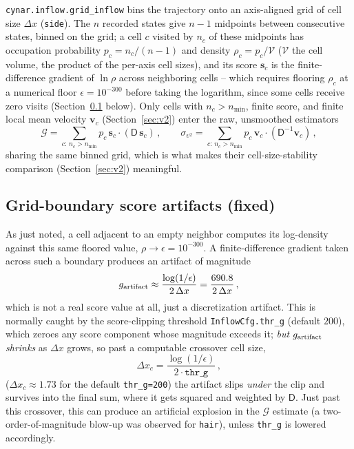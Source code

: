\documentclass[11pt]{article}
\newcommand{\inflow}{\mathcal{G}}
\newcommand{\MD}{{\mathsf{D}}}
\newcommand{\score}{{\bm{s}}}
\newcommand{\velo}{{\bm{v}}}
\begin{document}
\texttt{cynar.inflow.grid\_inflow} bins the trajectory onto an axis-aligned grid of cell size $\Delta x$ (\texttt{side}). The $n$ recorded states give $n-1$ midpoints between consecutive states, binned on the grid; a cell $c$ visited by $n_c$ of these midpoints has occupation probability $p_c=n_c/(n-1)$ and density $\rho_c=p_c/\mathcal V$ ($\mathcal V$ the cell volume, the product of the per-axis cell sizes), and its score $\score_c$ is the finite-difference gradient of $\ln\rho$ across neighboring cells -- which requires flooring $\rho_c$ at a numerical floor $\epsilon=10^{-300}$ before taking the logarithm, since some cells receive zero visits (Section~\ref{sec:boundary} below). Only cells with $n_c>n_{\min}$, finite score, and finite local mean velocity $\velo_c$ (Section~\ref{sec:v2}) enter the raw, unsmoothed estimators
\begin{equation}
\inflow = \!\!\sum_{c:\,n_c>n_{\min}}\!\! p_c\,\score_c\cdot(\MD\,\score_c) \, ,
\qquad
\sigma_{v^2} = \!\!\sum_{c:\,n_c>n_{\min}}\!\! p_c\,\velo_c\cdot(\MD^{-1}\velo_c) \, ,
\end{equation}
sharing the same binned grid, which is what makes their cell-size-stability comparison (Section~\ref{sec:v2}) meaningful.

\subsection{Grid-boundary score artifacts (fixed)}
\label{sec:boundary}

As just noted, a cell adjacent to an empty neighbor computes its log-density against this same floored value, $\rho\to\epsilon=10^{-300}$. A finite-difference gradient taken across such a boundary produces an artifact of magnitude
\begin{equation}
g_{\rm artifact} \approx \frac{\log(1/\epsilon)}{2\,\Delta x} = \frac{690.8}{2\,\Delta x} \, ,
\end{equation}
which is not a real score value at all, just a discretization artifact. This is normally caught by the score-clipping threshold \texttt{InflowCfg.thr\_g} (default $200$), which zeroes any score component whose magnitude exceeds it; \emph{but} $g_{\rm artifact}$ \emph{shrinks} as $\Delta x$ grows, so past a computable crossover cell size,
\begin{equation}
\Delta x_c = \frac{\log(1/\epsilon)}{2\cdot\texttt{thr\_g}} \, ,
\end{equation}
($\Delta x_c \approx 1.73$ for the default \texttt{thr\_g=200}) the artifact slips \emph{under} the clip and survives into the final sum, where it gets squared and weighted by $\MD$. Just past this crossover, this can produce an artificial explosion in the $\inflow$ estimate (a two-order-of-magnitude blow-up was observed for \texttt{hair}), unless \texttt{thr\_g} is lowered accordingly.
\end{document}
